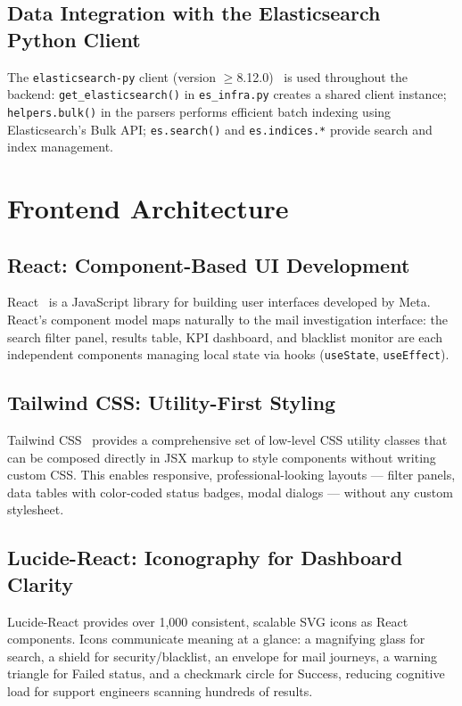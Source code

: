 \documentclass[12pt,a4paper,oneside]{report}
\begin{document}
\subsection{Data Integration with the Elasticsearch Python Client}

The \texttt{elasticsearch-py} client (version $\geq$8.12.0)~\cite{elasticsearchPy} is used throughout the backend:
\texttt{get\_elasticsearch()} in \texttt{es\_infra.py} creates a shared client instance;
\texttt{helpers.bulk()} in the parsers performs efficient batch indexing using Elasticsearch's Bulk API;
\texttt{es.search()} and \texttt{es.indices.*} provide search and index management.

\section{Frontend Architecture}

\subsection{React: Component-Based UI Development}

React~\cite{reactDocs} is a JavaScript library for building user interfaces developed by Meta.
React's component model maps naturally to the mail investigation interface: the search filter panel, results table, KPI dashboard, and blacklist monitor are each independent components managing local state via hooks (\texttt{useState}, \texttt{useEffect}).

\subsection{Tailwind CSS: Utility-First Styling}

Tailwind CSS~\cite{tailwindDocs} provides a comprehensive set of low-level CSS utility classes that can be composed directly in JSX markup to style components without writing custom CSS.
This enables responsive, professional-looking layouts --- filter panels, data tables with color-coded status badges, modal dialogs --- without any custom stylesheet.

\subsection{Lucide-React: Iconography for Dashboard Clarity}

Lucide-React provides over 1,000 consistent, scalable SVG icons as React components.
Icons communicate meaning at a glance: a magnifying glass for search, a shield for security/blacklist, an envelope for mail journeys, a warning triangle for Failed status, and a checkmark circle for Success, reducing cognitive load for support engineers scanning hundreds of results.
\end{document}

